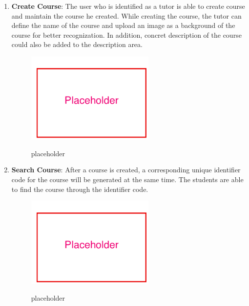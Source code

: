\begin{enumerate}
\item
\textbf{Create Course}: The user who is identified as a tutor is able to create course and maintain the course he created. While creating the course, the tutor can define the name of the course and upload an image as a background of the course for better recognization. In addition, concret description of the course could also be added to the description area.

\begin{figure}[!htbp]
  \caption{placeholder}
  \centering
    \includegraphics[width=0.6\textwidth]{Figures/placeholder.png}
  \label{fig:placeholder}
\end{figure}


\item
\textbf{Search Course}: After a course is created, a corresponding unique identifier code for the course will be generated at the same time. The students are able to find the course through the identifier code.

\begin{figure}[!htbp]
  \caption{placeholder}
  \centering
    \includegraphics[width=0.6\textwidth]{Figures/placeholder.png}
  \label{fig:placeholder}
\end{figure}


\end{enumerate}
